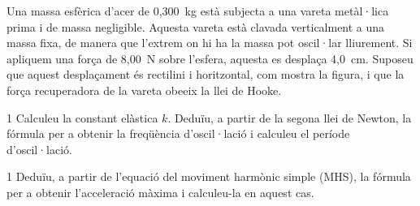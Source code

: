 Una massa esfèrica d'acer de 0,300~kg està subjecta a una vareta metàl·lica prima i de massa negligible. Aquesta vareta està clavada verticalment a una massa fixa, de manera que l'extrem on hi ha la massa pot oscil·lar lliurement. Si apliquem una força de 8,00~N sobre l'esfera, aquesta es desplaça 4,0~cm. Suposeu que aquest desplaçament és rectilini i horitzontal, com mostra la figura, i que la força recuperadora de la vareta obeeix la llei de Hooke.


\begin{apartat}{1}
Calculeu la constant elàstica $k$. Deduïu, a partir de la segona llei de Newton, la fórmula per a obtenir la freqüència d'oscil·lació i calculeu el període d'oscil·lació.
\end{apartat}

\begin{apartat}{1}
Deduïu, a partir de l'equació del moviment harmònic simple (MHS), la fórmula per a obtenir l'acceleració màxima i calculeu-la en aquest cas.
\end{apartat}
